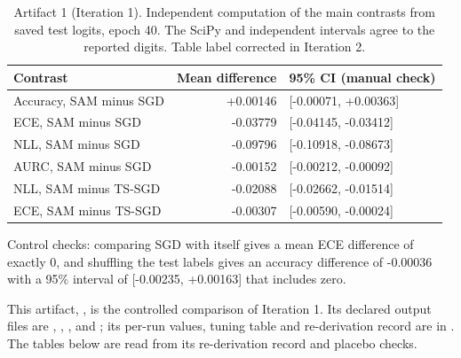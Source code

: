 \documentclass[11pt,letterpaper]{article}
\begin{document}
\begin{table}[!htbp]
\centering
\footnotesize
\caption{Artifact 1 (Iteration 1). Independent computation of the main contrasts from saved test logits, epoch 40. The SciPy and independent intervals agree to the reported digits. Table label corrected in Iteration 2.}
\label{tab:check1}
\begin{tabular}{lrl}
\toprule
Contrast & Mean difference & 95\% CI (manual check) \\
\midrule
Accuracy, SAM minus SGD & +0.00146 & [-0.00071, +0.00363] \\
ECE, SAM minus SGD & -0.03779 & [-0.04145, -0.03412] \\
NLL, SAM minus SGD & -0.09796 & [-0.10918, -0.08673] \\
AURC, SAM minus SGD & -0.00152 & [-0.00212, -0.00092] \\
NLL, SAM minus TS-SGD & -0.02088 & [-0.02662, -0.01514] \\
ECE, SAM minus TS-SGD & -0.00307 & [-0.00590, -0.00024] \\
\bottomrule
\end{tabular}
\end{table}

Control checks: comparing SGD with itself gives a mean ECE difference of exactly 0, and shuffling the test labels gives an accuracy difference of -0.00036 with a 95\% interval of [-0.00235, +0.00163] that includes zero.


This artifact, , is the controlled comparison of Iteration 1. Its declared output files are , , ,  and ; its per-run values, tuning table and re-derivation record are in . The tables below are read from its re-derivation record and placebo checks.
\end{document}
